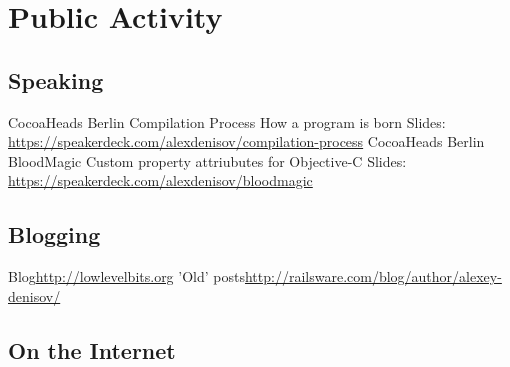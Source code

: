 \documentclass[11pt,a4paper]{moderncv}
\begin{document}
\section{Public Activity}
  \subsection{Speaking}
  \cventry
    {CocoaHeads Berlin}
    {Compilation Process}
    {How a program is born}
    {}{}
    {Slides: \url{https://speakerdeck.com/alexdenisov/compilation-process}}
  \cventry
    {CocoaHeads Berlin}
    {BloodMagic}
    {Custom property attriubutes for Objective-C}
    {}{}
    {Slides: \url{https://speakerdeck.com/alexdenisov/bloodmagic}}
  \subsection{Blogging}
    \cvline
    {Blog}{\url{http://lowlevelbits.org}}
    \cvline
    {'Old' posts}{\url{http://railsware.com/blog/author/alexey-denisov/}}
  \subsection{On the Internet}
\end{document}
